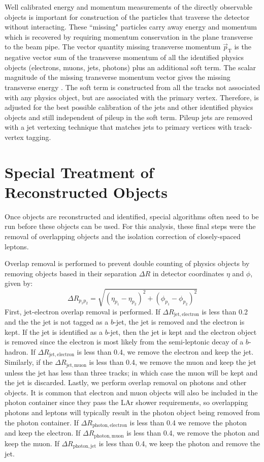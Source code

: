 Well calibrated energy and momentum measurements of the directly observable objects is important for construction of the particles that traverse the detector without interacting.  These ``missing" particles carry away energy and momentum which is recovered by requiring momentum conservation in the plane transverse to the beam pipe.  The vector quantity missing transverse momentum $\vec p_{\mathrm{T}}$ is the negative vector sum of the transverse momentum of all the identified physics objects (electrons, muons, jets, photons) plus an additional soft term.  The scalar magnitude of the missing transverse momentum vector gives the missing transverse energy \met. The soft term is constructed from all the tracks not associated with any physics object, but are associated with the primary vertex.  Therefore, \met{} is adjusted for the best possible calibration of the jets and other identified physics objects and still independent of pileup in the soft term.  Pileup jets are removed with a jet vertexing technique that matches jets to primary vertices with track-vertex tagging.


\section{Special Treatment of Reconstructed Objects}
\label{sec:obj:treat}
Once objects are reconstructed and identified, special algorithms often need to be run before these objects can be used.  For this analysis, these final steps were the removal of overlapping objects and the isolation correction of closely-spaced leptons.

Overlap removal is performed to prevent double counting of physics objects by removing objects based in their separation $\Delta R$ in detector coordinates $\eta$ and $\phi$, given by:
\begin{equation}
\Delta R_{p_1p_2} = \sqrt{(\eta_{p_1}-\eta_{p_2})^2+(\phi_{p_1}-\phi_{p_2})^2}
\end{equation} 
First, jet-electron overlap removal is performed.  If $\Delta R_{\mathrm{jet, electron}}$ is less than 0.2 and the the jet is not tagged as a $b$-jet, the jet is removed and the electron is kept.  If the jet is identified as a $b$-jet, then the jet is kept and the electron object is removed since the electron is most likely from the semi-leptonic decay of a $b$-hadron.  If $\Delta R_{\mathrm{jet, electron}}$ is less than 0.4, we remove the electron and keep the jet.  Similarly, if the $\Delta R_{\mathrm{jet, muon}}$ is less than 0.4, we remove the muon and keep the jet unless the jet has less than three tracks; in which case the muon will be kept and the jet is discarded.  Lastly, we perform overlap removal on photons and other objects.  It is common that electron and muon objects will also be included in the photon container since they pass the LAr shower requirements, so overlapping photons and leptons will typically result in the photon object being removed from the photon container.  If $\Delta R_{\mathrm{photon, electron}}$ is less than 0.4 we remove the photon and keep the electron.  If $\Delta R_{\mathrm{photon, muon}}$ is less than 0.4, we remove the photon and keep the muon.  If $\Delta R_{\mathrm{photon, jet}}$ is less than 0.4, we keep the photon and remove the jet.  

